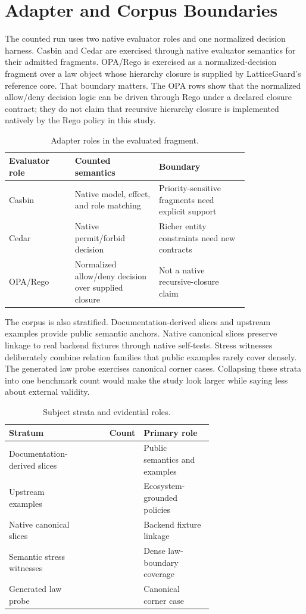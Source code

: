 \documentclass[10pt,conference]{IEEEtran}
\begin{document}
\section{Adapter and Corpus Boundaries}
The counted run uses two native evaluator roles and one normalized decision harness.  Casbin and Cedar are exercised through native evaluator semantics for their admitted fragments.  OPA/Rego is exercised as a normalized-decision fragment over a law object whose hierarchy closure is supplied by LatticeGuard's reference core.  That boundary matters.  The OPA rows show that the normalized allow/deny decision logic can be driven through Rego under a declared closure contract; they do not claim that recursive hierarchy closure is implemented natively by the Rego policy in this study.

\begin{table}[t]
\centering
\caption{Adapter roles in the evaluated fragment.}
\label{tab:adapterroles}
\begin{tabular}{p{0.22\linewidth}p{0.28\linewidth}p{0.30\linewidth}}
\toprule
Evaluator role & Counted semantics & Boundary \\
\midrule
Casbin & Native model, effect, and role matching & Priority-sensitive fragments need explicit support \\
Cedar & Native permit/forbid decision & Richer entity constraints need new contracts \\
OPA/Rego & Normalized allow/deny decision over supplied closure & Not a native recursive-closure claim \\
\bottomrule
\end{tabular}
\end{table}

The corpus is also stratified.  Documentation-derived slices and upstream examples provide public semantic anchors.  Native canonical slices preserve linkage to real backend fixtures through native self-tests.  Stress witnesses deliberately combine relation families that public examples rarely cover densely.  The generated law probe exercises canonical corner cases.  Collapsing these strata into one benchmark count would make the study look larger while saying less about external validity.

\begin{table}[t]
\centering
\caption{Subject strata and evidential roles.}
\label{tab:strata}
\begin{tabular}{p{0.34\linewidth}r p{0.34\linewidth}}
\toprule
Stratum & Count & Primary role \\
\midrule
Documentation-derived slices & \LGOfficialDocSources{} & Public semantics and examples \\
Upstream examples & \LGUpstreamExampleSources{} & Ecosystem-grounded policies \\
Native canonical slices & \LGNativeCanonicalSources{} & Backend fixture linkage \\
Semantic stress witnesses & \LGStressWitnessSources{} & Dense law-boundary coverage \\
Generated law probe & \LGGeneratedSources{} & Canonical corner case \\
\bottomrule
\end{tabular}
\end{table}
\end{document}
